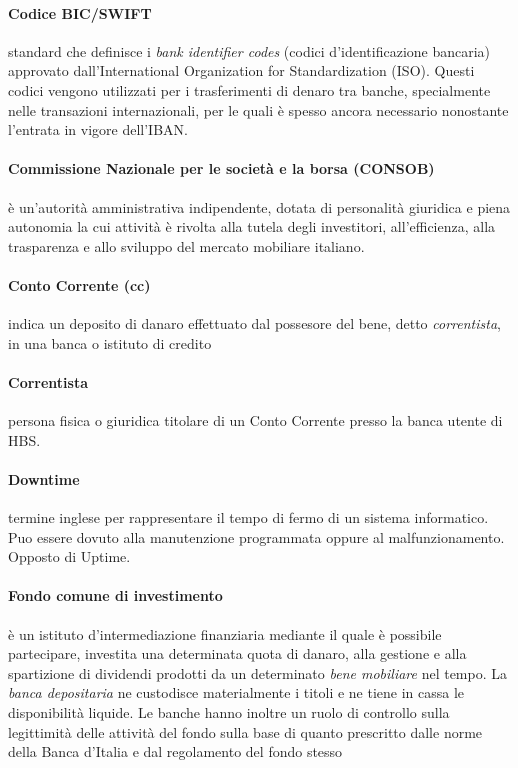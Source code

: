 \paragraph{Codice BIC/SWIFT}
	standard che definisce i \emph{bank identifier codes} (codici d'identificazione bancaria) approvato dall'International Organization for Standardization (ISO). Questi codici vengono utilizzati per i trasferimenti di denaro tra banche, specialmente nelle transazioni internazionali, per le quali è spesso ancora necessario nonostante l'entrata in vigore dell'IBAN. \cite{bic_wiki}
\paragraph{Commissione Nazionale per le societ\`a e la borsa (CONSOB)}
	è un'autorità amministrativa indipendente, dotata di personalità giuridica e piena autonomia la cui attività è rivolta alla tutela degli investitori, all'efficienza, alla trasparenza e allo sviluppo del mercato mobiliare italiano. \cite{consob_wiki}
\paragraph{Conto Corrente (cc)}
indica un deposito di danaro effettuato dal possesore del bene, detto \emph{correntista}, in una banca o istituto di credito
\paragraph{Correntista} \label{glossario:correntista}
	persona fisica o giuridica titolare di un Conto Corrente presso la banca utente di HBS.
\paragraph{Downtime}
termine inglese per rappresentare il tempo di fermo di un sistema informatico.
Puo essere dovuto alla manutenzione programmata oppure al malfunzionamento.
Opposto di Uptime.
\paragraph{Fondo comune di investimento}
	è un istituto d'intermediazione finanziaria mediante il quale è possibile partecipare, investita una determinata quota di danaro, alla gestione e alla spartizione di dividendi prodotti da un determinato \emph{bene mobiliare} nel tempo. La \emph{banca depositaria} ne custodisce materialmente i titoli e ne tiene in cassa le disponibilità liquide. Le banche hanno inoltre un ruolo di controllo sulla legittimità delle attività del fondo sulla base di quanto prescritto dalle norme della Banca d'Italia e dal regolamento del fondo stesso

